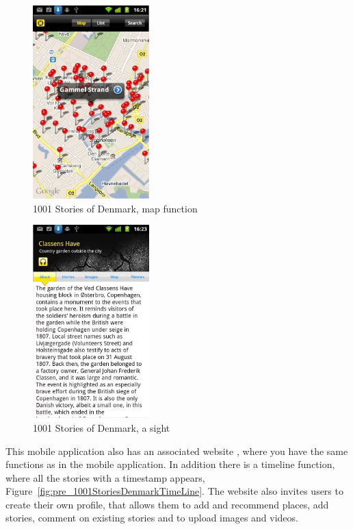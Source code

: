 \documentclass[11pt]{book}
\begin{document}
\begin{figure}[H]
      \centering
      \includegraphics[width=0.4\textwidth]{Figures/Prestudy/1001storiesMap.png}
      \caption{1001 Stories of Denmark, map function}
      \label{fig:pre_1001StoriesDenmarkAppMap}
\end{figure}

\begin{figure}[H]
      \centering
      \includegraphics[width=0.4\textwidth]{Figures/Prestudy/1001storiesStory.png}
      \caption{1001 Stories of Denmark, a sight}
      \label{fig:pre_1001StoriesDenmarkAppStory}
\end{figure}

This mobile application also has an associated website \cite{1001fort}, where you have the same functions as in the mobile application. In addition there is a timeline function, where all the stories with a timestamp appears, Figure~\ref{fig:pre_1001StoriesDenmarkTimeLine}. The website also invites users to create their own profile, that allows them to add and recommend places, add stories, comment on existing stories and to  upload images and videos.
\end{document}
